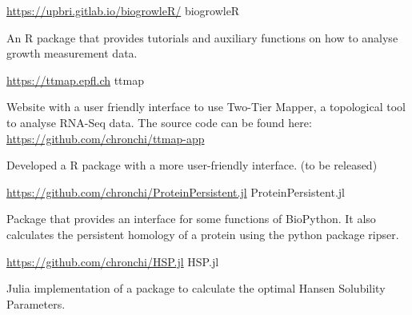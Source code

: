 

\begin{cventries}

\cventry
  {\url{https://upbri.gitlab.io/biogrowleR/}} %
  {biogrowleR} %
  {}{}
  {
    \begin{cvitems} %
      \item {An R package that provides tutorials and auxiliary 
             functions on how to analyse growth measurement data.}
    \end{cvitems}
  }


\cventry
  {\url{https://ttmap.epfl.ch}} %
  {ttmap} %
  {}{}
  {
    \begin{cvitems} %
      \item {Website with a user friendly interface to use Two-Tier Mapper, a 
             topological tool to analyse RNA-Seq data. The source code can be
             found here: \url{https://github.com/chronchi/ttmap-app}}
      \item {Developed a R package with a more user-friendly interface. 
             (to be released)} 
    \end{cvitems}
  }



\cventry
  {\url{https://github.com/chronchi/ProteinPersistent.jl}} %
  {ProteinPersistent.jl} %
  {}{}
  {
    \begin{cvitems} %
      \item {Package that provides an interface for some functions of BioPython.
      It also calculates the persistent homology of a protein using the python
      package ripser.}
    \end{cvitems}
  }

\cventry
  {\url{https://github.com/chronchi/HSP.jl}} %
  {HSP.jl} %
  {}{}
  {
    \begin{cvitems} %
      \item {Julia implementation of a package to calculate the
      optimal Hansen Solubility Parameters.}
    \end{cvitems}
  }


\end{cventries}

